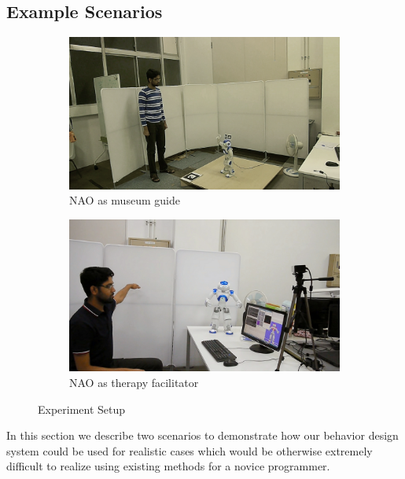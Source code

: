 \documentclass{llncs}
\begin{document}
\subsection{Example Scenarios}
\begin{figure}
\centering
\begin{subfigure}[t]{0.49\textwidth}
\includegraphics[width=\textwidth]{../thesis/assets/scenario_museum.png}
\caption[Experiment Setup 1]{NAO as museum guide}
\label{fig:scenario1_setup}
\end{subfigure}
\begin{subfigure}[t]{0.49\textwidth}
\includegraphics[width=\textwidth]{../thesis/assets/scenario_therapy.png}
\caption[Experiment Setup 2]{NAO as therapy facilitator}
\label{fig:scenario2_setup}
\end{subfigure}
\caption[Experiment Setup]{Experiment Setup}
\label{fig:scenarios_setup}
\end{figure}
	In this section we describe two scenarios to demonstrate how our behavior design system could be used for realistic cases which would be otherwise extremely difficult to realize using existing methods for a novice programmer.
\end{document}
